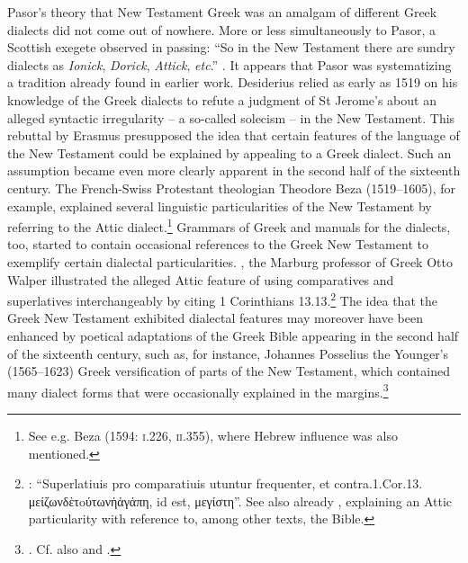 Pasor’s theory that New Testament Greek was an amalgam of different Greek dialects did not come out of nowhere. More or less simultaneously to Pasor, a Scottish exegete observed in passing: “So in the New Testament there are sundry dialects as \textit{Ionick}, \textit{Dorick}, \textit{Attick}, \textit{etc}.” \citep[102]{Weemes1632}. It appears that Pasor was systematizing a tradition already found in earlier work. Desiderius \citet[270]{Erasmus1519} relied as early as 1519 on his knowledge of the Greek dialects to refute a judgment of St Jerome’s about an alleged syntactic irregularity – a so-called solecism – in the New Testament. This rebuttal by Erasmus presupposed the idea that certain features of the language of the New Testament could be explained by appealing to a Greek dialect. Such an assumption became even more clearly apparent in the second half of the sixteenth century. The French-Swiss Protestant theologian Theodore Beza (1519–1605), for example, explained several linguistic particularities of the New Testament by referring to the Attic dialect.\footnote{See e.g. Beza (1594: \textsc{i.}226, \textsc{ii}.355), where Hebrew influence was also mentioned.} Grammars of Greek and manuals for the dialects, too, started to contain occasional references to the Greek New Testament to exemplify certain dialectal particularities. \citealt{In1589}, the Marburg professor of Greek Otto Walper illustrated the alleged Attic feature of using comparatives and superlatives interchangeably by citing 1 Corinthians 13.13.\footnote{\citet[32]{Walper1589}: “Superlatiuis pro comparatiuis utuntur frequenter, et contra.1.Cor.13. μείζωνδὲτoύτωνἡἀγάπη, id est, μεγίστη”. See also already \citet[251]{Ruland1556}, explaining an Attic particularity with reference to, among other texts, the Bible.} The idea that the Greek New Testament exhibited dialectal features may moreover have been enhanced by poetical adaptations of the Greek Bible appearing in the second half of the sixteenth century, such as, for instance, Johannes Posselius the Younger’s (1565–1623) Greek versification of parts of the New Testament, which contained many dialect forms that were occasionally explained in the margins.\footnote{\citet{Posselius1599}. Cf. also \citet{Jamot1593} and \citet{Keimann1649}.}

